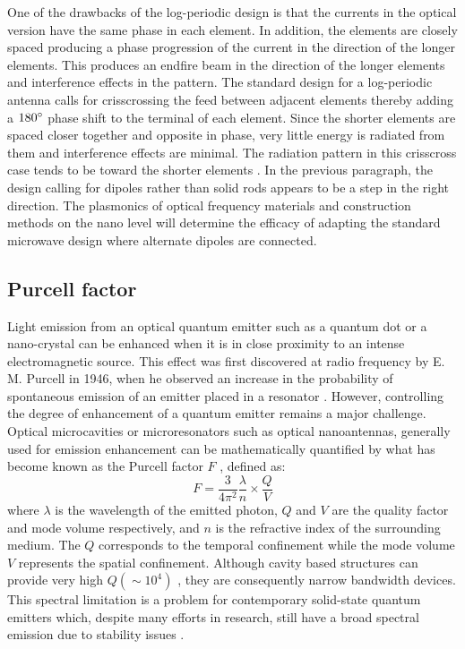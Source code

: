 \documentclass[11pt]{article}
\begin{document}
One of the drawbacks of the log-periodic design is that the currents in the optical version have the same phase in each element. In addition, the elements are closely spaced producing a phase progression of the current in the direction of the longer elements. This produces an endfire beam in the direction of the longer elements and interference effects in the pattern. The standard design for a log-periodic antenna calls for crisscrossing the feed between adjacent elements thereby adding a $180\degree$ phase shift to the terminal of each element. Since the shorter elements are spaced closer together and opposite in phase, very little energy is radiated from them and interference effects are minimal. The radiation pattern in this crisscross case tends to be toward the shorter elements \cite{Balanis2015}. In the previous paragraph, the design calling for dipoles rather than solid rods appears to be a step in the right direction. The plasmonics of optical frequency materials and construction methods on the nano level will determine the efficacy of adapting the standard microwave design where alternate dipoles are connected.
\subsection{Purcell factor}
%
Light emission from an optical quantum emitter such as a quantum dot or a nano-crystal can be enhanced when it is in close proximity to an intense electromagnetic source. This effect was first discovered at radio frequency by E. M. Purcell in 1946, when he observed an increase in the probability of spontaneous emission of an emitter placed in a resonator \cite{Purcell1946}. However, controlling the degree of enhancement of a quantum emitter remains a major challenge. Optical microcavities or microresonators such as optical nanoantennas, generally used for emission enhancement can be mathematically quantified by what has become known as the Purcell factor $F$ \cite{Vahala2003}, defined as:
%
\begin{equation}
  F = \frac{3}{4 \pi^2} \frac{ \lambda}{n} \times \frac{Q}{V}
  \label{eq:purcell}
\end{equation}
%
where $\lambda$ is the wavelength of the emitted photon, $Q$ and $V$ are the quality factor and mode volume respectively, and $n$ is the refractive index of the surrounding medium. The $Q$ corresponds to the temporal confinement while the mode volume $V$ represents the spatial confinement. Although cavity based structures can provide very high $Q (\sim 10^4)$ \cite{Song2005}, they are consequently narrow bandwidth devices. This spectral limitation is a problem for contemporary solid-state quantum emitters which, despite many efforts in research, still have a broad spectral emission due to stability issues \cite{Gaebel2004}.
\end{document}
